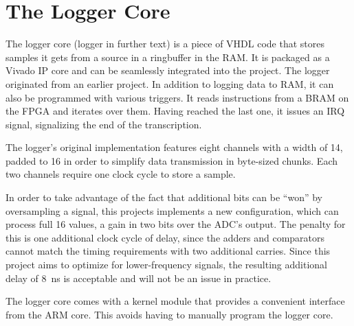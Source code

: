 %
%
\section{The Logger Core} %
\label{sec:fpga:logger}

The logger core (logger  in further text) is a piece of  VHDL code that stores
samples it  gets from a  source in  a ringbuffer in  the RAM. It is packaged  as a
Vivado IP core and can be seamlessly integrated into the project.
The logger originated  from an earlier project\cite{huess-schnid}. 
In addition  to logging data  to RAM, it can  also be programmed  with various
triggers. It reads  instructions from  a BRAM  on the  FPGA and  iterates over
them. Having reached  the last one, it  issues an IRQ signal,  signalizing the
end of the transcription.

The logger's original  implementation features eight channels with  a width of
\SI{14}{\bit}, padded to \SI{16}{\bit} in  order to simplify data transmission
in byte-sized chunks. Each two channels require one clock cycle to store
a sample.

In order to take advantage of the  fact that additional bits can be ``won'' by
oversampling a signal, this projects implements a new configuration, which can
process full \SI{16}{\bit}  values, a gain in two bits  over the ADC's output.
The penalty for this is one additional  clock cycle of delay, since the adders
and  comparators cannot  match  the timing  requirements  with two  additional
carries.  Since this project aims to optimize for lower-frequency signals, the
resulting additional delay of \SI{8}{\nano\second}  is acceptable and will not
be an issue in practice.

The  logger  core comes  with  a  kernel  module  that provides  a  convenient
interface from the ARM core. This avoids having to manually program the logger
core.

%
%
